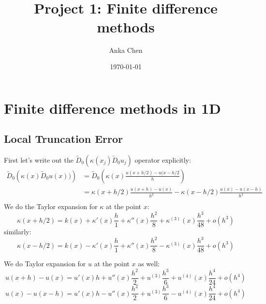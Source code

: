 \documentclass[12pt, fullpage,letterpaper]{article}
\title{Project 1: Finite difference methods}
\author{Anka Chen}
\date{\today}
\begin{document}
\maketitle

\section{Finite difference methods in 1D}
\subsection{Local Truncation Error}
First let's write out the $\widetilde{D}_0 \left( \kappa(x_j) \widetilde{D}_0 u_j \right)$ operator explicitly:
\begin{equation}
\begin{split}
    \widetilde{D}_0 \left( \kappa(x) \widetilde{D}_0 u(x)) \right) &= \widetilde{D}_0 \left(\kappa(x) \frac{u(x+h/2) - u(x-h/2}{h} \right)\\
    &= \kappa(x+h/2)\frac{u(x+h) - u(x)}{h^2} - \kappa(x-h/2)\frac{u(x) - u(x-h)}{h^2} \\
\end{split}
\end{equation}
We do the Taylor expansion for $\kappa$ at the point $x$:
\begin{equation}
\kappa(x+h/2)=k(x) + \kappa'(x)\frac{h}{1} + \kappa''(x)\frac{h^2}{8}  + \kappa^{(3)}(x)\frac{h^3}{48} + o(h^3)
\end{equation}
similarly:
\begin{equation}
\kappa(x-h/2)=k(x) - \kappa'(x)\frac{h}{1} + \kappa''(x)\frac{h^2}{8}  - \kappa^{(3)}(x)\frac{h^3}{48} + o(h^3)
\end{equation}

We do Taylor expansion for $u$ at the point $x$ as well: 
\begin{equation}
u(x+h) - u(x)= u'(x)h + u''(x)\frac{h^2}{2} + u^{(3)}\frac{h^3}{6} + u^{(4)}(x)\frac{h^4}{24} + o(h^4)
\end{equation}
\begin{equation}
u(x) - u(x-h)= u'(x)h - u''(x)\frac{h^2}{2} + u^{(3)}\frac{h^3}{6} - u^{(4)}(x)\frac{h^4}{24} + o(h^4)
\end{equation}
\end{document}
